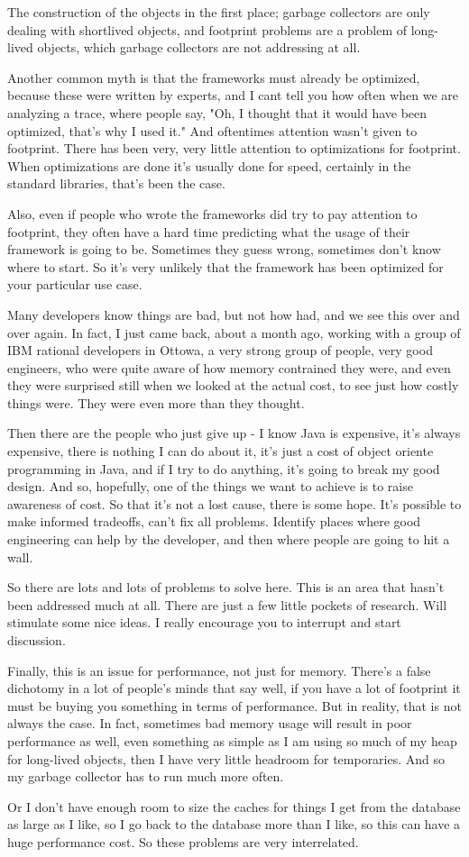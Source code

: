 The construction of the objects in the first place; garbage collectors are only
dealing with shortlived objects, and footprint problems are a problem of
long-lived objects, which garbage collectors are not addressing at all.

Another common myth is that the frameworks must already be optimized, because
these were written by experts, and I cant tell you how often when we are
analyzing a trace, where people say, "Oh, I thought that it would have been
optimized, that's why I used it." And oftentimes attention wasn't given to
footprint. There has been very, very little attention to optimizations for
footprint.  When optimizations are done it's usually done for speed, certainly
in the standard libraries, that's been the case.

Also, even if people who wrote the frameworks did try to pay attention to
footprint, they often have a hard time predicting what the usage of their
framework is going to be. Sometimes they guess wrong, sometimes don't know where
to start.  So it's very unlikely that the framework has been optimized for your
particular use case.

Many developers know things are bad, but not how had, and we see this over and
over again. In fact, I just came back, about a month ago, working with a group
of IBM rational developers in Ottowa, a very strong group of people, very good
engineers, who were quite aware of how memory contrained they were, and even
they were surprised still when we looked at the actual cost, to see just how
costly things were. They were even more than they thought.

Then there are the people who just give up - I know Java is expensive, it's
always expensive, there is nothing I can do about it, it's just a cost of object
oriente programming in Java, and if I try to do anything, it's going to break my
good design. And so, hopefully, one of the things we want to achieve is to raise
awareness of cost. So that it's not a lost cause, there is some hope.  It's
possible to make informed tradeoffs, can't fix all problems. Identify places
where good engineering can help by the developer, and then where people are
going to hit a wall.

So there are lots and lots of problems to solve here. This is an area that
hasn't been addressed much at all.  There are just a few little pockets of
research. Will stimulate some nice ideas. I really encourage you to interrupt
and start discussion.

Finally, this is an issue for performance, not just for memory. There's a false
dichotomy in a lot of people's minds that say well, if you have a lot of
footprint it must be buying you something in terms of performance. But in
reality, that is not always the case. In fact, sometimes bad memory usage will
result in poor performance as well, even something as simple as I am using so
much of my heap for long-lived objects, then I have very little headroom for
temporaries.  And so my garbage collector has to run much more often.

Or I don't have enough room to size the caches for things I get from the
database as large as I like, so I go back to the database more than I like, so
this can have a huge performance cost. So these problems are very interrelated.